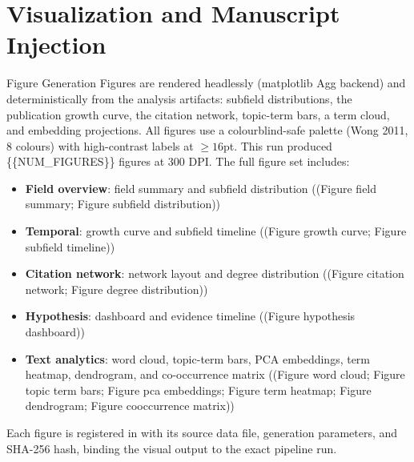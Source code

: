\documentclass[
  ignorenonframetext,
]{beamer}
\author{}
\date{}
\providecommand{\tightlist}{%
  \setlength{\itemsep}{0pt}\setlength{\parskip}{0pt}}
\begin{document}
\section{Visualization and Manuscript
Injection}\label{visualization-and-manuscript-injection}

\begin{frame}{Figure Generation}
\label{figure-generation}
Figures are rendered headlessly (matplotlib Agg backend) and
deterministically from the analysis artifacts: subfield distributions,
the publication growth curve, the citation network, topic-term bars, a
term cloud, and embedding projections. All figures use a
colourblind-safe palette (Wong 2011, 8 colours) with high-contrast
labels at \(\geq 16\)pt. This run produced \{\{NUM\_FIGURES\}\} figures
at 300 DPI. The full figure set includes:

\begin{itemize}
\tightlist
\item
  \textbf{Field overview}: field summary and subfield distribution
  ((Figure field summary; Figure subfield distribution))
\item
  \textbf{Temporal}: growth curve and subfield timeline ((Figure growth
  curve; Figure subfield timeline))
\item
  \textbf{Citation network}: network layout and degree distribution
  ((Figure citation network; Figure degree distribution))
\item
  \textbf{Hypothesis}: dashboard and evidence timeline ((Figure
  hypothesis dashboard))
\item
  \textbf{Text analytics}: word cloud, topic-term bars, PCA embeddings,
  term heatmap, dendrogram, and co-occurrence matrix ((Figure word
  cloud; Figure topic term bars; Figure pca embeddings; Figure term
  heatmap; Figure dendrogram; Figure cooccurrence matrix))
\end{itemize}

Each figure is registered in  with its
source data file, generation parameters, and SHA-256 hash, binding the
visual output to the exact pipeline run.
\end{frame}
\end{document}
